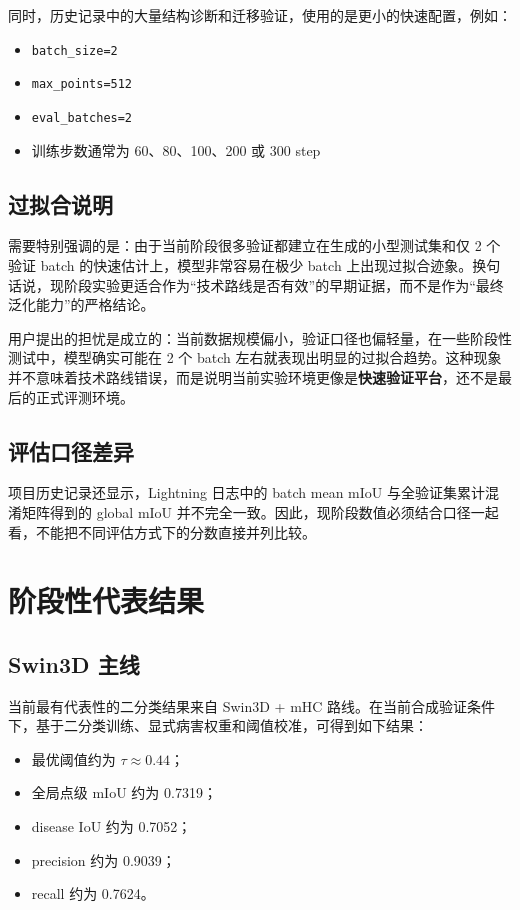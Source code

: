 \documentclass[12pt]{ctexart}
\begin{document}
同时，历史记录中的大量结构诊断和迁移验证，使用的是更小的快速配置，例如：

\begin{itemize}
  \item \texttt{batch\_size=2}
  \item \texttt{max\_points=512}
  \item \texttt{eval\_batches=2}
  \item 训练步数通常为 60、80、100、200 或 300 step
\end{itemize}

\subsection{过拟合说明}

需要特别强调的是：由于当前阶段很多验证都建立在生成的小型测试集和仅 2 个验证 batch 的快速估计上，模型非常容易在极少 batch 上出现过拟合迹象。换句话说，现阶段实验更适合作为“技术路线是否有效”的早期证据，而不是作为“最终泛化能力”的严格结论。

用户提出的担忧是成立的：当前数据规模偏小，验证口径也偏轻量，在一些阶段性测试中，模型确实可能在 2 个 batch 左右就表现出明显的过拟合趋势。这种现象并不意味着技术路线错误，而是说明当前实验环境更像是\textbf{快速验证平台}，还不是最后的正式评测环境。

\subsection{评估口径差异}

项目历史记录还显示，Lightning 日志中的 batch mean mIoU 与全验证集累计混淆矩阵得到的 global mIoU 并不完全一致。因此，现阶段数值必须结合口径一起看，不能把不同评估方式下的分数直接并列比较。

\section{阶段性代表结果}

\subsection{Swin3D 主线}

当前最有代表性的二分类结果来自 Swin3D + mHC 路线。在当前合成验证条件下，基于二分类训练、显式病害权重和阈值校准，可得到如下结果：

\begin{itemize}
  \item 最优阈值约为 $\tau \approx 0.44$；
  \item 全局点级 mIoU 约为 0.7319；
  \item disease IoU 约为 0.7052；
  \item precision 约为 0.9039；
  \item recall 约为 0.7624。
\end{itemize}
\end{document}
